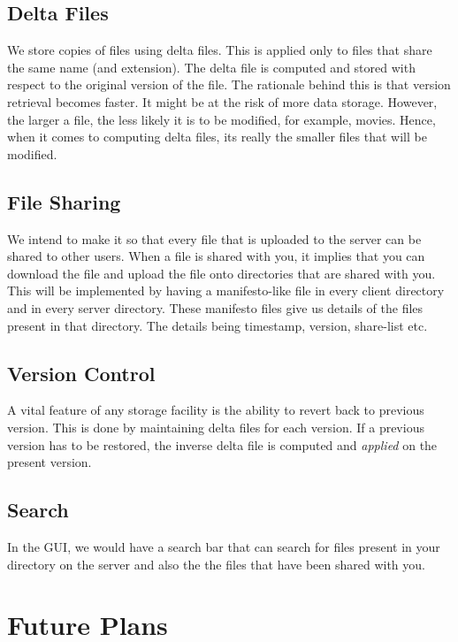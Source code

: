 \documentclass[]{article}
\begin{document}
\subsection{Delta Files}
We store copies of files using delta files. This is applied only to files that share the same name (and extension). The delta file is computed and stored with respect to the original version of the file. The rationale behind this is that version retrieval becomes faster. It might be at the risk of more data storage. However, the larger a file, the less likely it is to be modified, for example, movies. Hence, when it comes to computing delta files, its really the smaller files that will be modified.
\subsection{File Sharing}
We intend to make it so that every file that is uploaded to the server can be shared to other users. When a file is shared with you, it implies that you can download the file and upload the file onto directories that are shared with you. This will be implemented by having a manifesto-like file in every client directory and in every server directory.
These manifesto files give us details of the files present in that directory. The details being timestamp, version, share-list etc.

\subsection{Version Control}
A vital feature of any storage facility is the ability to revert back to previous version. This is done by maintaining delta files for each version. If a previous version has to be restored, the inverse delta file is computed and \textit{applied} on the present version. 

\subsection{Search}
In the GUI, we would have a search bar that can search for files present in your directory on the server and also the the files that have been shared with you.

\section{{\LARGE Future Plans}}
\end{document}
